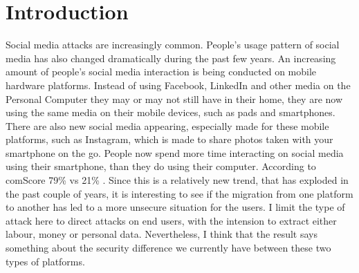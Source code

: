 \section{Introduction}
Social media attacks are increasingly common. People’s usage pattern of social media has also changed dramatically during the past few years. An increasing amount of people’s social media interaction is being conducted on mobile hardware platforms. Instead of using Facebook, LinkedIn and other media on the Personal Computer they may or may not still have in their home, they are now using the same media on their mobile devices, such as pads and smartphones. There are also new social media appearing, especially made for these mobile platforms, such as Instagram, which is made to share photos taken with your smartphone on the go.
People now spend more time interacting on social media using their smartphone, than they do using their computer. According to comScore 79\% vs 21\% \cite{CrossPlatform2016}. Since this is a relatively new trend, that has exploded in the past couple of years, it is interesting to see if the migration from one platform to another has led to a more unsecure situation for the users. I limit the type of attack here to direct attacks on end users, with the intension to extract either labour, money or personal data. Nevertheless, I think that the result says something about the security difference we currently have between these two types of platforms.
